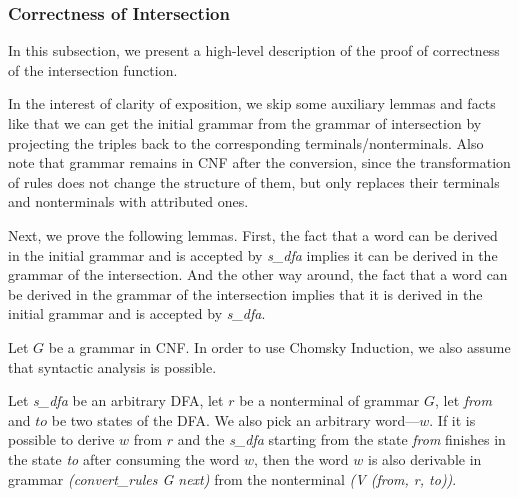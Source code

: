 \subsubsection{Correctness of Intersection}
\label{sec:correctintersection}

In this subsection, we present a high-level description of the proof of correctness of the intersection function.

In the interest of clarity of exposition, we skip some auxiliary lemmas and facts like that we can get the initial grammar from the grammar of intersection by projecting the triples back to the corresponding terminals/nonterminals. Also note that grammar remains in CNF after the conversion, since the transformation of rules does not change the structure of them, but only replaces their terminals and nonterminals with attributed ones.

Next, we prove the following lemmas. First, the fact that a word can be derived in the initial grammar and is accepted by \textit{s\_dfa} implies it can be derived in the grammar of the intersection. And the other way around, the fact that a word can be derived in the grammar of the intersection implies that it is derived in the initial grammar and is accepted by \textit{s\_dfa}.

Let $G$ be a grammar in CNF. In order to use Chomsky Induction, we also assume that syntactic analysis is possible.

\begin{theorem}
    Let \textit{s\_dfa} be an arbitrary DFA, let $r$ be a nonterminal of grammar $G$, let \textit{from} and $to$ be two states of the DFA. We also pick an arbitrary word---$w$. If it is possible to derive $w$ from $r$ and the \textit{s\_dfa} starting from the state \textit{from} finishes in the state \textit{to} after consuming the word $w$, then the word $w$ is also derivable in grammar \textit{(convert\_rules G next)} from the nonterminal \textit{(V (from, r, to))}.
\end{theorem}

